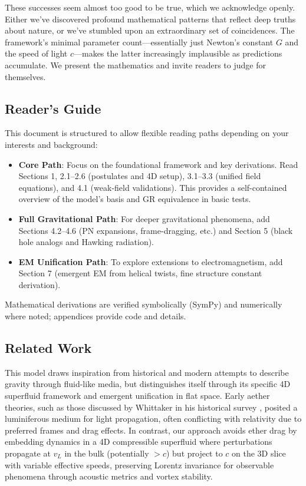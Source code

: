 These successes seem almost too good to be true, which we acknowledge openly. Either we've discovered profound mathematical patterns that reflect deep truths about nature, or we've stumbled upon an extraordinary set of coincidences. The framework's minimal parameter count---essentially just Newton's constant $G$ and the speed of light $c$---makes the latter increasingly implausible as predictions accumulate. We present the mathematics and invite readers to judge for themselves.

\subsection{Reader's Guide}

This document is structured to allow flexible reading paths depending on your interests and background:

\begin{itemize}
    \item \textbf{Core Path}: Focus on the foundational framework and key derivations. Read Sections 1, 2.1--2.6 (postulates and 4D setup), 3.1--3.3 (unified field equations), and 4.1 (weak-field validations). This provides a self-contained overview of the model's basis and GR equivalence in basic tests.

    \item \textbf{Full Gravitational Path}: For deeper gravitational phenomena, add Sections 4.2--4.6 (PN expansions, frame-dragging, etc.) and Section 5 (black hole analogs and Hawking radiation).

    \item \textbf{EM Unification Path}: To explore extensions to electromagnetism, add Section 7 (emergent EM from helical twists, fine structure constant derivation).
\end{itemize}

Mathematical derivations are verified symbolically (SymPy) and numerically where noted; appendices provide code and details.

\subsection{Related Work}

This model draws inspiration from historical and modern attempts to describe gravity through fluid-like media, but distinguishes itself through its specific 4D superfluid framework and emergent unification in flat space. Early aether theories, such as those discussed by Whittaker in his historical survey \cite{whittaker1951history}, posited a luminiferous medium for light propagation, often conflicting with relativity due to preferred frames and drag effects. In contrast, our approach avoids ether drag by embedding dynamics in a 4D compressible superfluid where perturbations propagate at $v_L$ in the bulk (potentially $>c$) but project to $c$ on the 3D slice with variable effective speeds, preserving Lorentz invariance for observable phenomena through acoustic metrics and vortex stability.

